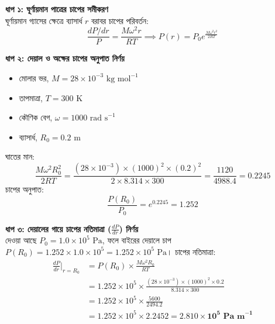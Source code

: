 \documentclass[12pt, a4paper]{article}
\begin{document}
\begin{tcolorbox}[solutionbox={সমাধান (Solution)}]
    \noindent
    \textbf{ধাপ ১: ঘূর্ণায়মান পাত্রের চাপের সমীকরণ} \\
    ঘূর্ণায়মান গ্যাসের ক্ষেত্রে ব্যাসার্ধ $r$ বরাবর চাপের পরিবর্তন:
    \[ \frac{dP/dr}{P} = \frac{M \omega^2 r}{R T} \implies P(r) = P_0 e^{\frac{M \omega^2 r^2}{2 R T}} \]
    
    \vspace{0.4em}
    \noindent\textbf{ধাপ ২: দেয়াল ও অক্ষের চাপের অনুপাত নির্ণয়}
    \begin{itemize}[leftmargin=1.5em, itemsep=0.2em]
        \item মোলার ভর, $M = 28 \times 10^{-3}\text{ kg mol}^{-1}$
        \item তাপমাত্রা, $T = 300\text{ K}$
        \item কৌণিক বেগ, $\omega = 1000\text{ rad s}^{-1}$
        \item ব্যাসার্ধ, $R_0 = 0.2\text{ m}$
    \end{itemize}
    ঘাতের মান:
    \[ \frac{M \omega^2 R_0^2}{2 R T} = \frac{(28 \times 10^{-3}) \times (1000)^2 \times (0.2)^2}{2 \times 8.314 \times 300} = \frac{1120}{4988.4} = 0.2245 \]
    চাপের অনুপাত:
    \[ \frac{P(R_0)}{P_0} = e^{0.2245} = \mathbf{1.252} \]
    
    \vspace{0.4em}
    \noindent\textbf{ধাপ ৩: দেয়ালের গায়ে চাপের নতিমাত্রা ($\frac{dP}{dr}$) নির্ণয়} \\
    দেওয়া আছে $P_0 = 1.0 \times 10^5\text{ Pa}$, ফলে বাইরের দেয়ালে চাপ $P(R_0) = 1.252 \times 1.0 \times 10^5 = 1.252 \times 10^5\text{ Pa}$। চাপের নতিমাত্রা:
    \begin{align*}
        \frac{dP}{dr}\Big|_{r=R_0} &= P(R_0) \times \frac{M \omega^2 R_0}{R T} \\
        &= 1.252 \times 10^5 \times \frac{(28 \times 10^{-3}) \times (1000)^2 \times 0.2}{8.314 \times 300} \\
        &= 1.252 \times 10^5 \times \frac{5600}{2494.2} \\
        &= 1.252 \times 10^5 \times 2.2452 = \mathbf{2.810 \times 10^5\text{ Pa m}^{-1}}
    \end{align*}
\end{tcolorbox}

\vspace{2em}
\end{document}
